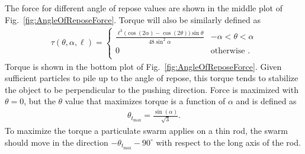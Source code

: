 The force for different angle of repose values are shown in the middle plot of Fig.~\ref{fig:AngleOfReposeForce}. 
Torque will also be similarly defined as
\begin{align}
\tau(\theta, \alpha, \ell) =\left\{
\begin{array}{ll}
\frac{\ell^3\Big(\cos(2\alpha)-\cos(2\theta)\Big)\sin{\theta} }{48\sin^2\alpha}&   -\alpha<\theta<\alpha\\
0 &    \textrm{otherwise .}\\
\end{array} 
\right.
\end{align}
Torque is shown in the bottom plot of Fig.~\ref{fig:AngleOfReposeForce}.
 Given sufficient particles to pile up to the angle of repose, this torque tends to stabilize the object to be perpendicular to the pushing direction.
Force is maximized with $\theta=0$, but the $\theta$ value that maximizes torque is a function of $\alpha$ and is defined as
\begin{align}
\theta_{t_{\max}} = \frac{\sin(\alpha)}{\sqrt{3}}.
\end{align}
To maximize the torque a particulate swarm applies on a thin rod, the swarm should move in the direction $-\theta_{t_{\max}} - 90^\circ$ with respect to the long axis of the rod.



